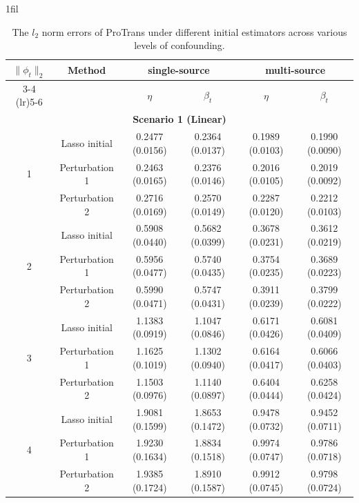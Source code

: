 \documentclass[12pt]{article}
\makeatletter
\newcommand*{\centerfloat}{%
  \parindent \z@
  \leftskip \z@ \@plus 1fil \@minus \marginparwidth
  \rightskip \leftskip
  \parfillskip \z@skip}
\makeatother
\begin{document}
\begin{table}[!ht]
\renewcommand{\arraystretch}{0.6}
\footnotesize
\centerfloat
\caption{The $l_2$ norm errors of ProTrans under different initial estimators across various levels of confounding.}
\label{tab:our_only_vary_phi_l2}
    \begin{tabular}{cccccc}
        \toprule
        \multirow{2}{*}{$\|\phi_t\|_2$} & \multirow{2}{*}{\textbf{Method}} & \multicolumn{2}{c}{\textbf{single-source}} & \multicolumn{2}{c}{\textbf{multi-source}}\\
        \cmidrule(lr){3-4} \cmidrule(lr){5-6} 
        & & $\eta$ & $\beta_{t}$ & $\eta$& $\beta_{t}$ \\
        \midrule
        \multicolumn{6}{c}{\textbf{Scenario 1 (Linear)}}\\
        \hline
        \multirow{3}{*}{1} 
        & Lasso initial &0.2477 (0.0156) &0.2364 (0.0137) &0.1989 (0.0103) &0.1990 (0.0090)\\
        & Perturbation 1& 0.2463 (0.0165)  & 0.2376 (0.0146)& 0.2016 (0.0105)  & 0.2019 (0.0092) \\ 
        & Perturbation 2 & 0.2716 (0.0169) & 0.2570 (0.0149)& 0.2287 (0.0120) & 0.2212 (0.0103) \\
        \hline
        \multirow{3}{*}{2} 
        & Lasso initial & 0.5908 (0.0440) &0.5682 (0.0399) &0.3678 (0.0231) &0.3612 (0.0219)\\ 
        & Perturbation 1  & 0.5956 (0.0477) & 0.5740 (0.0435)& 0.3754 (0.0235) & 0.3689 (0.0223)  \\ 
        & Perturbation 2  & 0.5990 (0.0471)  & 0.5747 (0.0431) & 0.3911 (0.0239) & 0.3799 (0.0222) \\
        \hline
        \multirow{3}{*}{3} 
        & Lasso initial & 1.1383 (0.0919) &1.1047 (0.0846) &0.6171 (0.0426) & 0.6081 (0.0409) \\ 
        & Perturbation 1 & 1.1625 (0.1019) & 1.1302 (0.0940) & 0.6164 (0.0417) &0.6066 (0.0403)\\ 
        & Perturbation 2  & 1.1503 (0.0976) & 1.1140 (0.0897) & 0.6404 (0.0444) & 0.6258 (0.0424)  \\
        \hline
        \multirow{3}{*}{4} 
        & Lasso initial & 1.9081 (0.1599)& 1.8653 (0.1472) &0.9478 (0.0732) &0.9452 (0.0711)\\ 
        & Perturbation 1 & 1.9230 (0.1634) & 1.8834 (0.1518) & 0.9974 (0.0747) & 0.9786 (0.0718)  \\ 
        & Perturbation 2 & 1.9385 (0.1724) & 1.8910 (0.1587)& 0.9912 (0.0745) & 0.9798 (0.0724) \\

\end{tabular}
\end{table}
\end{document}
